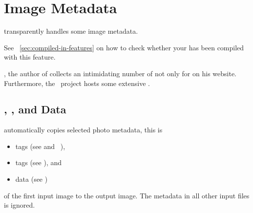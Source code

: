 

\section{\label{sec:metadata}%
  Image Metadata}

\App{} transparently handles some image metadata.

See \sectionName~\ref{sec:compiled-in-features} on how to check whether your \App{} has been
compiled with this feature.

\begin{geeknote}
  , the author of  collects an
  intimidating number of  not only for
   on his website.  Furthermore, the ~project hosts
  some extensive .
\end{geeknote}


\subsection{\label{sec:metadata-exif-iptc-xmp}%
  , , and  Data}

\App{} automatically copies selected photo metadata, this is

\begin{itemize}
\item
   tags (see  and
  \appendixName~),

\item
   tags (see ), and

\item
   data (see )
\end{itemize}

\noindent of the first input image to the output image.  The metadata in all other input files
is ignored.

